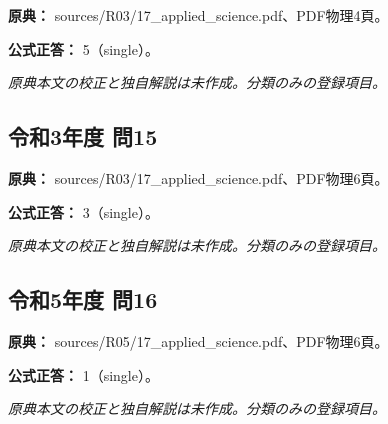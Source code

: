 \noindent\textbf{原典：} sources/R03/17\_applied\_science.pdf、PDF物理4頁。

\textbf{公式正答：} 5（single）。

\par\textit{原典本文の校正と独自解説は未作成。分類のみの登録項目。}

\subsection{令和3年度 問15}
\label{q:r03-reg-applied-15}

\noindent\textbf{原典：} sources/R03/17\_applied\_science.pdf、PDF物理6頁。

\textbf{公式正答：} 3（single）。

\par\textit{原典本文の校正と独自解説は未作成。分類のみの登録項目。}

\subsection{令和5年度 問16}
\label{q:r05-reg-applied-16}

\noindent\textbf{原典：} sources/R05/17\_applied\_science.pdf、PDF物理6頁。

\textbf{公式正答：} 1（single）。

\par\textit{原典本文の校正と独自解説は未作成。分類のみの登録項目。}
